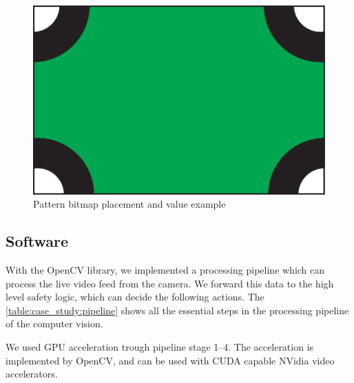 \begin{figure}[h]
	\centering
	\includegraphics[valign=c,width=.5\linewidth]{include/figures/chapter_6/math_2}
	\caption{Pattern bitmap placement and value example}
	\label{fig:case_study:convoluter_image}
\end{figure}

\subsection{Software}

With the OpenCV library, we implemented a processing pipeline which can process the live video feed from the camera. We forward this data to the high level safety logic, which can decide the following actions. The \cref{table:case_study:pipeline} shows all the essential steps in the processing pipeline of the computer vision.

We used GPU acceleration trough pipeline stage 1--4. The acceleration is implemented by OpenCV, and can be used with CUDA capable NVidia video accelerators.

